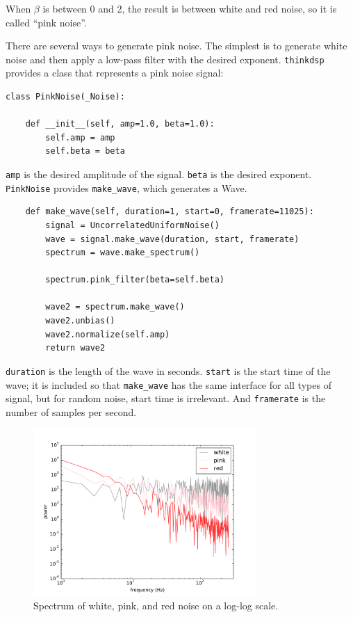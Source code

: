 \documentclass[12pt]{book}
\begin{document}
When $\beta$ is between 0 and 2, the result is between white and
red noise, so it is called ``pink noise''.

There are several ways to generate pink noise.  The simplest is to
generate white noise and then apply a low-pass filter with the
desired exponent.  {\tt thinkdsp} provides a class that represents
a pink noise signal:

\begin{verbatim}
class PinkNoise(_Noise):

    def __init__(self, amp=1.0, beta=1.0):
        self.amp = amp
        self.beta = beta
\end{verbatim}

{\tt amp} is the desired amplitude of the signal.
{\tt beta} is the desired exponent.  {\tt PinkNoise} provides
\verb"make_wave", which generates a Wave.

\begin{verbatim}
    def make_wave(self, duration=1, start=0, framerate=11025):
        signal = UncorrelatedUniformNoise()
        wave = signal.make_wave(duration, start, framerate)
        spectrum = wave.make_spectrum()

        spectrum.pink_filter(beta=self.beta)

        wave2 = spectrum.make_wave()
        wave2.unbias()
        wave2.normalize(self.amp)
        return wave2
\end{verbatim}

{\tt duration} is the length of the wave in seconds.  {\tt start} is
the start time of the wave; it is included so that \verb"make_wave"
has the same interface for all types of signal, but for random noise,
start time is irrelevant.  And {\tt framerate} is the number of
samples per second.

\begin{figure}
\centerline{\includegraphics[height=2.5in]{figs/noise-triple.pdf}}
\caption{Spectrum of white, pink, and red noise on a log-log scale.}
\label{fig.noise-triple}
\end{figure}
\end{document}
